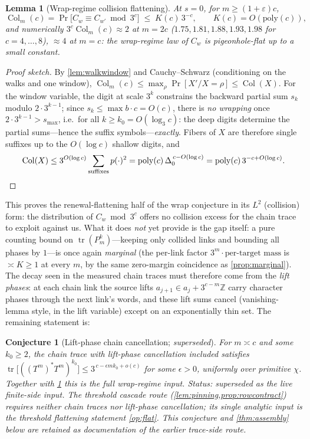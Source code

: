 \documentclass[11pt]{article}
\newcommand{\Z}{\mathbb{Z}}
\theoremstyle{plain}
\newtheorem{lemma}{Lemma}
\newtheorem{conjecture}{Conjecture}
\theoremstyle{definition}
\theoremstyle{remark}
\begin{document}
\begin{lemma}[Wrap-regime collision flattening]\label{lem:flat}
At $s=0$, for $m\ge(1+\varepsilon)c$,
\[
\operatorname{Col}_m(c)=\Pr\bigl[C_w\equiv C_{w'}\bmod3^c\bigr]
\;\le\;K(c)\,3^{-c},
\qquad K(c)=O(\mathrm{poly}(c)) ,
\]
and numerically $3^c\operatorname{Col}_m(c)\approx2$ at $m=2c$
($1.75,1.81,1.88,1.93,1.98$ for $c=4,\dots,8$), $\approx4$ at $m=c$: the
wrap-regime law of $C_w$ is pigeonhole-flat up to a small constant.
\end{lemma}
\begin{proof}[Proof sketch]
By \cref{lem:walkwindow} and Cauchy--Schwarz (conditioning on the walks and one
window), $\operatorname{Col}_m(c)\le\max_\rho\Pr[X'/X=\rho]\le
\operatorname{Col}(X)$. For the window variable, the digit at scale $3^k$
constrains the backward partial sum $s_k$ modulo $2\cdot3^{k-1}$; since
$s_k\le\max b\cdot c=O(c)$, there is \emph{no wrapping} once
$2\cdot3^{k-1}>s_{\max}$, i.e.\ for all $k\ge k_0=O(\log_3c)$: the deep digits
determine the partial sums---hence the suffix symbols---\emph{exactly}. Fibers
of $X$ are therefore single suffixes up to the $O(\log c)$ shallow digits, and
\[
\operatorname{Col}(X)\le3^{O(\log c)}\sum_{\text{suffixes}}p(\cdot)^2
=\mathrm{poly}(c)\,\Delta_0^{\,c-O(\log c)}=\mathrm{poly}(c)\,3^{-c+O(\log c)} .
\qedhere
\]
\end{proof}

\noindent This proves the renewal-flattening half of the wrap conjecture in its
$L^2$ (collision) form: the distribution of $C_w\bmod3^c$ offers no
collision excess for the chain trace to exploit against us. What it does
\emph{not} yet provide is the gap itself: a pure counting bound on
$\operatorname{tr}(P_m^k)$---keeping only collided links and bounding all
phases by $1$---is once again \emph{marginal} (the per-link factor
$3^m\cdot\text{per-target mass}$ is $\asymp K\ge1$ at every $m$, by the same
zero-margin coincidence as \cref{prop:marginal}). The decay seen in the
measured chain traces must therefore come from the \emph{lift phases}: at each
chain link the source lifts $a_{j+1}\in a_j+3^{c-m}\Z$ carry character phases
through the next link's words, and these lift sums cancel
(vanishing-lemma style, in the lift variable) except on an exponentially thin
set. The remaining statement is:

\begin{conjecture}[Lift-phase chain cancellation; \emph{superseded}]\label{conj:wrap}
For $m\asymp c$ and some $k_0\ge2$, the chain trace with lift-phase
cancellation included satisfies
$\operatorname{tr}\bigl[((T^m)^*T^m)^{k_0}\bigr]\le
3^{\,c-\epsilon mk_0+o(c)}$ for some $\epsilon>0$, uniformly over primitive
$\chi$. Together with \cref{lem:flat} this is the full wrap-regime input.
\emph{Status: superseded as the live finite-side input. The threshold
cascade route (\cref{lem:pinning,prop:rowcontract}) requires neither
chain traces nor lift-phase cancellation; its single analytic input is the
threshold flattening statement \cref{op:flat}. This conjecture and
\cref{thm:assembly} below are retained as documentation of the earlier
trace-side route.}
\end{conjecture}
\end{document}
